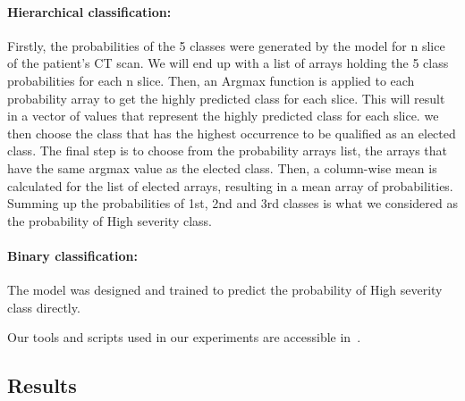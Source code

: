 \paragraph{Hierarchical classification:}Firstly, the probabilities of the 5 classes were generated by the model for n slice of the patient's CT scan. We will end up with a list of arrays holding the 5 class probabilities for each n slice. Then, an Argmax function is applied to each probability array to get the highly predicted class for each slice. This will result in a vector of values that represent the highly predicted class for each slice. we then choose the class that has the highest occurrence to be qualified as an elected class. The final step is to choose from the probability arrays list, the arrays that have the same argmax value as the elected class. Then, a column-wise mean is calculated for the list of elected arrays, resulting in a mean array of probabilities. Summing up the probabilities of 1st, 2nd and 3rd classes is what we considered as the probability of High severity class.
\paragraph{Binary classification:}The model was designed and trained to predict the probability of High severity class directly.

Our tools and scripts used in our experiments are accessible in~\cite{anouargit}.

\subsection{Results}

